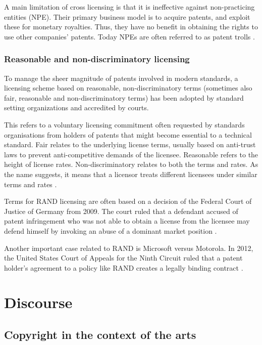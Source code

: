 \documentclass[a4paper]{report}
\begin{document}
A main limitation of cross licensing is that it is ineffective against non-practicing entities (NPE). Their primary business model is to acquire patents, and exploit these for monetary royalties. Thus, they have no benefit in obtaining the rights to use other companies' patents. Today NPEs are often referred to as patent trolls \parencite{PatentTroll}. 

\subsection{Reasonable and non-discriminatory licensing}
To manage the sheer magnitude of patents involved in modern standards, a licensing scheme based on reasonable, non-discriminatory terms (sometimes also fair, reasonable and non-discriminatory terms) has been adopted by standard setting organizations and accredited by courts.

This refers to a voluntary licensing commitment often requested by standards organisations from holders of patents that might become essential to a technical standard. Fair relates to the underlying license terms, usually based on anti-trust laws to prevent anti-competitive demands of the licensee. Reasonable refers to the height of license rates. Non-discriminatory relates to both the terms and rates. As the name suggests, it means that a licensor treats different licensees under similar terms and rates \parencite{WikiRAND}. 

Terms for RAND licensing are often based on a decision of the Federal Court of Justice of Germany from 2009. The court ruled that a defendant accused of patent infringement who was not able to obtain a license from the licensee may defend himself by invoking an abuse of a dominant market position \parencite{OrangeBook}.
 
Another important case related to RAND is Microsoft versus Motorola. In 2012, the United States Court of Appeals for the Ninth Circuit ruled that a patent holder's agreement to a policy like RAND creates a legally binding contract \parencite{MicrosoftVsMotorola}.

\chapter{Discourse}
\label{ch:Disc}

\section{Copyright in the context of the arts}
\label{sec:CopyArts}
\end{document}
